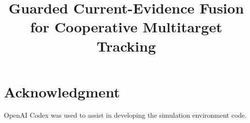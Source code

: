 \documentclass[letterpaper,10pt,conference]{ieeeconf}
\title{\LARGE\bf Guarded Current-Evidence Fusion for Cooperative Multitarget Tracking}
\author{}
\begin{document}
\maketitle
\thispagestyle{empty}\pagestyle{empty}
\begin{abstract}

\end{abstract}






\FloatBarrier
\clearpage
\section*{Acknowledgment}
OpenAI Codex was used to assist in developing the simulation environment code.


\end{document}
